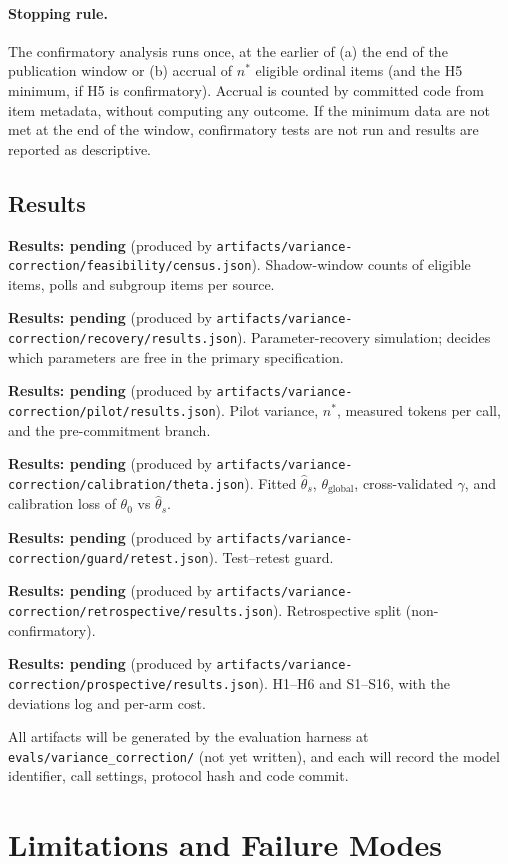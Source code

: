 \documentclass[11pt]{article}
\newcommand{\pending}[1]{\textbf{Results: pending} (produced by \nolinkurl{#1}).}
\begin{document}
\paragraph{Stopping rule.} The confirmatory analysis runs once, at the earlier of (a) the end of the publication window or (b) accrual of $n^\ast$ eligible ordinal items (and the H5 minimum, if H5 is confirmatory). Accrual is counted by committed code from item metadata, without computing any outcome. If the minimum data are not met at the end of the window, confirmatory tests are not run and results are reported as descriptive.

\subsection{Results}
\sloppy
\noindent\pending{artifacts/variance-correction/feasibility/census.json} Shadow-window counts of eligible items, polls and subgroup items per source.

\noindent\pending{artifacts/variance-correction/recovery/results.json} Parameter-recovery simulation; decides which parameters are free in the primary specification.

\noindent\pending{artifacts/variance-correction/pilot/results.json} Pilot variance, $n^\ast$, measured tokens per call, and the pre-commitment branch.

\noindent\pending{artifacts/variance-correction/calibration/theta.json} Fitted $\hat\theta_s$, $\theta_{\text{global}}$, cross-validated $\gamma$, and calibration loss of $\theta_0$ vs $\hat\theta_s$.

\noindent\pending{artifacts/variance-correction/guard/retest.json} Test--retest guard.

\noindent\pending{artifacts/variance-correction/retrospective/results.json} Retrospective split (non-confirmatory).

\noindent\pending{artifacts/variance-correction/prospective/results.json} H1--H6 and S1--S16, with the deviations log and per-arm cost.

\noindent All artifacts will be generated by the evaluation harness at \nolinkurl{evals/variance_correction/} (not yet written), and each will record the model identifier, call settings, protocol hash and code commit.

\section{Limitations and Failure Modes}
\label{sec:limits}
\end{document}
